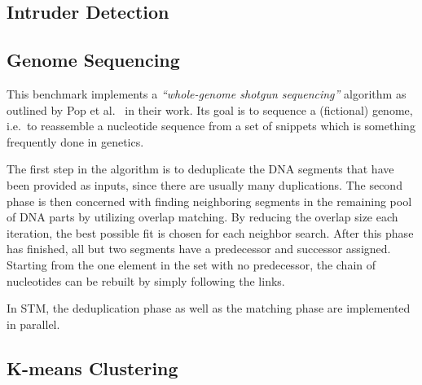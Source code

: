 \subsection{Intruder Detection}

\subsection{Genome Sequencing}
This benchmark implements a \emph{\enquote{whole-genome shotgun sequencing}} algorithm as outlined by Pop et al.~\cite{pop2002genome} in their work.
Its goal is to sequence a (fictional) genome, i.e.\ to reassemble a nucleotide sequence from a set of snippets which is something frequently done in genetics.

The first step in the algorithm is to deduplicate the DNA segments that have been provided as inputs, since there are usually many duplications.
The second phase is then concerned with finding neighboring segments in the remaining pool of DNA parts by utilizing overlap matching.
By reducing the overlap size each iteration, the best possible fit is chosen for each neighbor search.
After this phase has finished, all but two segments have a predecessor and successor assigned.
Starting from the one element in the set with no predecessor, the chain of nucleotides can be rebuilt by simply following the links.

In STM, the deduplication phase as well as the matching phase are implemented in parallel.

\subsection{K-means Clustering}







